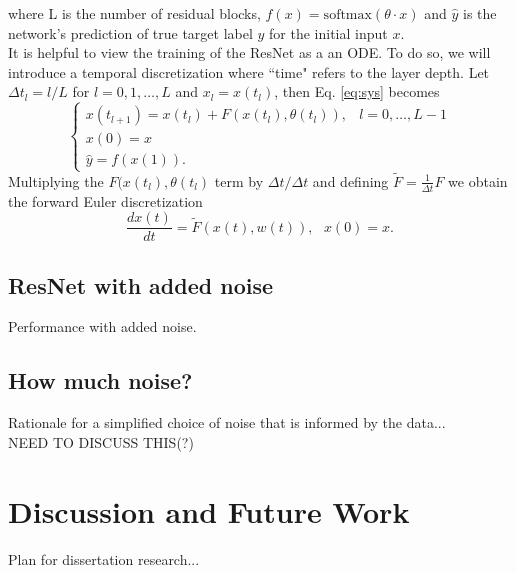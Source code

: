 \documentclass[12pt]{article}
\begin{document}
where L is the number of residual blocks, $f(x) = \text{softmax}(\theta \cdot x)$ and $\hat y$ is the network's prediction of true target label $y$ for the initial input $x$. \\
\indent It is helpful to view the training of the ResNet as a an ODE. To do so, we will introduce a temporal discretization where ``time" refers to the layer depth. Let $\Delta t_l = l/L$ for $l=0,1,\dots,L$ and $x_l = x(t_l)$, then Eq. \ref{eq:sys} becomes
\begin{equation} \begin{cases}
x(t_{l+1}) = x(t_l) + F(x(t_l),\theta(t_l)), & l=0,\dots,L-1 \\
x(0) = x \\
\hat y = f(x(1)).
\end{cases} \end{equation}
Multiplying the $F(x(t_l),\theta(t_l)$ term by $\Delta t/\Delta t$ and defining $\tilde{F} = \frac{1}{\Delta t} F$ we obtain the forward Euler discretization
\begin{equation}
  \dfrac{dx(t)}{dt} = \tilde{F}(x(t),w(t)),\text{   }  x(0) = x.
\end{equation}
\subsection{ResNet with added noise}
Performance with added noise.
\subsection{How much noise?}
Rationale for a simplified choice of noise that is informed by the data...\\
NEED TO DISCUSS THIS(?)
\section{Discussion and Future Work}
Plan for dissertation research...

\end{document}
